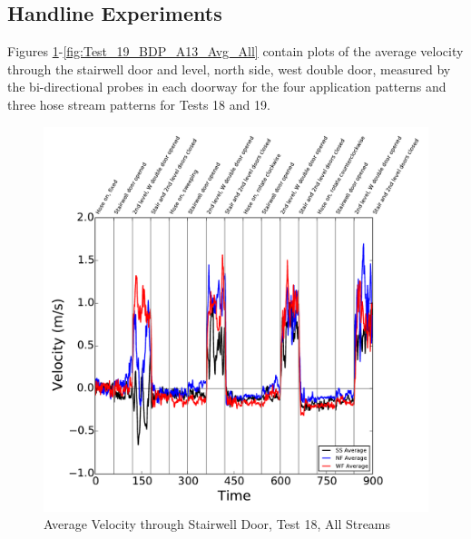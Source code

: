 \documentclass[12pt,oneside]{book}
\begin{document}
\subsection{Handline Experiments}

Figures \ref{fig:Test_18_BDP_A10_Avg_All}-\ref{fig:Test_19_BDP_A13_Avg_All} contain plots of the average velocity through the stairwell door and  level, north side, west double door, measured by the bi-directional probes in each doorway for the four application patterns and three hose stream patterns for Tests 18 and 19. 

\begin{figure}[!ht]
\includegraphics[width=6in]{../../../Figures/Hose_Test_Figures/Test_18_West_063014_BDP_A10_Avg}
\caption{Average Velocity through Stairwell Door, Test 18, All Streams}
\label{fig:Test_18_BDP_A10_Avg_All}
\end{figure}
\end{document}
